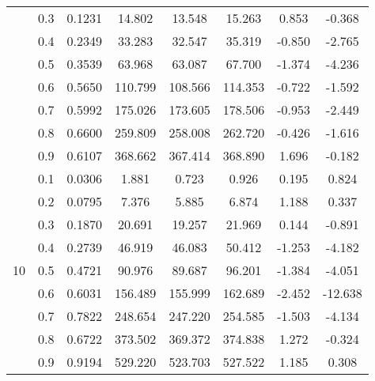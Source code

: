 \documentclass[11pt,a4paper]{report}
\begin{document}
\begin{longtable}{ | c | c || c | c | c | c | c | c | }
 & 0.3 & 0.1231 & 14.802 & 13.548 & 15.263 & 0.853 & -0.368 \\
 & 0.4 & 0.2349 & 33.283 & 32.547 & 35.319 & -0.850 & -2.765 \\
 & 0.5 & 0.3539 & 63.968 & 63.087 & 67.700 & -1.374 & -4.236 \\
 & 0.6 & 0.5650 & 110.799 & 108.566 & 114.353 & -0.722 & -1.592 \\
 & 0.7 & 0.5992 & 175.026 & 173.605 & 178.506 & -0.953 & -2.449 \\
 & 0.8 & 0.6600 & 259.809 & 258.008 & 262.720 & -0.426 & -1.616 \\
 & 0.9 & 0.6107 & 368.662 & 367.414 & 368.890 & 1.696 & -0.182 \\
 \hline
\multirow{9}{*}{10} & 0.1 & 0.0306 & 1.881 & 0.723 & 0.926 & 0.195 & 0.824 \\
 & 0.2 & 0.0795 & 7.376 & 5.885 & 6.874 & 1.188 & 0.337 \\
 & 0.3 & 0.1870 & 20.691 & 19.257 & 21.969 & 0.144 & -0.891 \\
 & 0.4 & 0.2739 & 46.919 & 46.083 & 50.412 & -1.253 & -4.182 \\
 & 0.5 & 0.4721 & 90.976 & 89.687 & 96.201 & -1.384 & -4.051 \\
 & 0.6 & 0.6031 & 156.489 & 155.999 & 162.689 & -2.452 & -12.638 \\
 & 0.7 & 0.7822 & 248.654 & 247.220 & 254.585 & -1.503 & -4.134 \\
 & 0.8 & 0.6722 & 373.502 & 369.372 & 374.838 & 1.272 & -0.324 \\
 & 0.9 & 0.9194 & 529.220 & 523.703 & 527.522 & 1.185 & 0.308 \\
 \hline
\hline
\end{longtable}
\end{document}
